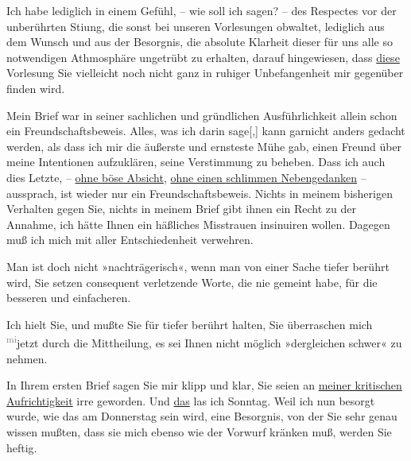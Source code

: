 \pstart
           Ich habe lediglich in einem Gefühl, – wie soll ich sagen? – des Respectes vor der
               unberührten Sti{\geminationm}ung, die sonst bei unseren Vorlesungen
               obwaltet, lediglich aus dem Wunsch und aus der Besorgnis, die absolute Klarheit
               dieser für uns alle so notwendigen Athmosphäre ungetrübt zu erhalten, darauf
               hingewiesen, dass \uline{diese} Vorlesung Sie vielleicht noch
               nicht ganz in ruhiger Unbefangenheit mir gegenüber finden wird.\pend
           
\pstart
           Mein Brief war in seiner sachlichen und gründlichen Ausführlichkeit allein schon ein
               Freundschaftsbeweis. Alles, was ich darin sage{[},{]} kann garnicht
               anders gedacht werden, als dass ich mir die äußerste und ernsteste Mühe gab, einen
               Freund über meine {\pb}Intentionen
               aufzuklären, seine Verstimmung zu beheben. Dass ich auch dies Letzte, – \uline{ohne böse Absicht}, \uline{ohne
                  einen schlimmen Nebengedanken} – aussprach, ist wieder nur ein
               Freundschaftsbeweis. Nichts in meinem bisherigen Verhalten gegen Sie, nichts in
               meinem Brief gibt ihnen ein Recht zu der Annahme, ich hätte Ihnen ein häßliches
               Misstrauen insinuiren wollen. Dagegen muß ich mich mit aller Entschiedenheit
               verwehren.\pend
           
\pstart
           Man ist doch nicht »nachträgerisch«, wenn man von einer Sache tiefer berührt wird,
               Sie setzen consequent verletzende Worte, die  nie
               gemeint habe, für die besseren und einfacheren.\pend
           
\pstart
           Ich hielt Sie, und mußte Sie für tiefer berührt halten, Sie überraschen mich \substVorne{}\textsuperscript{\textcolor{gray}{mi}}\substDazwischen{}jetzt\substHinten{}
               durch die Mittheilung, es sei Ihnen nicht möglich »dergleichen schwer« zu nehmen.\pend
           
\pstart
           In Ihrem ersten Brief sagen Sie mir klipp und klar, Sie seien an \uline{meiner kritischen Aufrichtigkeit} irre geworden. Und \uline{das} las ich Sonntag.
               Weil ich nun besorgt wurde, wie das am Donnerstag sein
               wird, eine Besorgnis, von der Sie sehr genau wissen mußten, dass sie mich ebenso wie
               der Vorwurf kränken muß, werden Sie heftig.\pend
           
